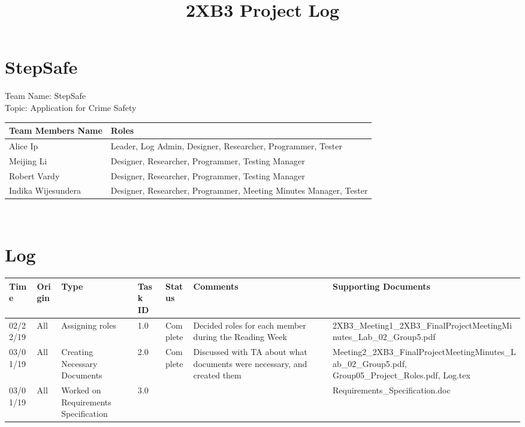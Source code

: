 \documentclass[10pt]{article}
\begin{document}
\title{2XB3 Project Log}
\maketitle



\section {StepSafe}
Team Name: StepSafe \\
Topic: Application for Crime Safety \\

 \begin{tabular}{|p{4cm}| p{10cm}|} 
 \hline
 Team Members Name & Roles \\
 \hline
  Alice Ip & Leader, Log Admin, Designer, Researcher, Programmer, Tester  \\
 \hline
  Meijing Li & Designer, Researcher, Programmer, Testing Manager  \\
 \hline
  Robert Vardy & Designer, Researcher, Programmer, Testing Manager  \\
 \hline
  Indika Wijesundera & Designer, Researcher, Programmer, Meeting Minutes Manager, Tester  \\
 \hline
 
\end{tabular} \\

\section{Log}
 \begin{tabular}{|p{1.5cm}| p{1cm}| p{2cm}| p{1cm}| p{1.5cm}| p{2cm}| p{2cm}|} 
 \hline
Time & Origin & Type & Task ID & Status & Comments & Supporting Documents   \\  
 \hline
 02/22/19 & All & Assigning roles & 1.0 & Complete & Decided roles for each member during the Reading Week & 2XB3\_Meeting1\_2XB3\_FinalProjectMeetingMinutes\_Lab\_02\_Group5.pdf  \\
 \hline
 03/01/19 & All & Creating Necessary Documents & 2.0 & Complete & Discussed with TA about what documents were necessary, and created them & Meeting2\_2XB3\_FinalProjectMeetingMinutes\_Lab\_02\_Group5.pdf, Group05\_Project\_Roles.pdf, Log.tex \\
 \hline
  03/01/19 & All & Worked on Requirements Specification & 3.0 &  &  & Requirements\_Specification.doc \\
 \hline
\end{tabular}
\end{document}
